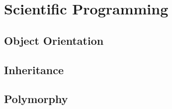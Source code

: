 \chapter{Scientific Programming}

\section{Object Orientation}

\section{Inheritance}

\section{Polymorphy}